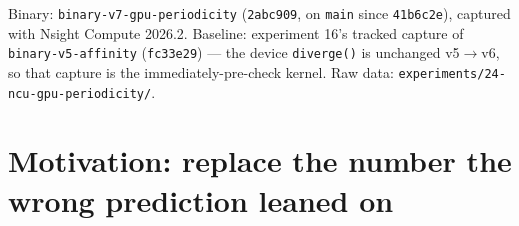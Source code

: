 \documentclass[
	english,
	letterpaper, oneside
]{article}
\begin{document}
\templatePagecfg
\templateFinalcfg

\inserttitle

\begin{center}\small\textsf{%
Binary: \texttt{binary-v7-gpu-periodicity} (\texttt{2abc909}, on \texttt{main}
since \texttt{41b6c2e}), captured with Nsight Compute 2026.2. Baseline:
experiment 16's tracked capture of \texttt{binary-v5-affinity}
(\texttt{fc33e29}) --- the device \texttt{diverge()} is unchanged
v5$\to$v6, so that capture is the immediately-pre-check kernel. Raw data:
\texttt{experiments/24-ncu-gpu-periodicity/}.%
}\end{center}

\begin{abstract}
Reports 16/17 pinned this kernel at exactly 100.0\% warp execution
efficiency on interior content, and report 21 cited that number to defer
the GPU-side periodicity check (``expect a loss''). Report 23 falsified the
conclusion at the wall ($-20.5\%$ hybrid); this report replaces the stale
counters. Same method as experiment 16 (same four content-regime specs,
same kernel caps, same metrics; aggregation validated to reproduce
experiment 16's summary exactly; clocks match within 1\%, so durations
compare). The price of the early exit is small and precisely locatable:
interior warp efficiency falls only $100.0 \to 96.3\%$ (minimum
kernel 95.0\%) while interior kernels get $9.9\times$ faster;
the isolated overhead --- pure-exterior content, where the check never
fires --- is $+12.4\%$, half the 25--30\% estimate, because
\texttt{nvcc} short-circuits the two anchor compares into one
always-executed \texttt{DSETP}. The cost concentrates on boundary content
($+23\%$, kernels production routes to the CPU anyway); the production mix
nets $9.4\times$ per kernel. The FP64 pipe stays at $\sim$85\% of peak in
every regime, before and after: the kernel remains FP64-bound, and every
metric that ``degraded'' --- warp efficiency, achieved occupancy --- reads
worse precisely because the work now ends early.
\end{abstract}

\section{Motivation: replace the number the wrong prediction leaned on}
\label{sec:motivation}
\end{document}
